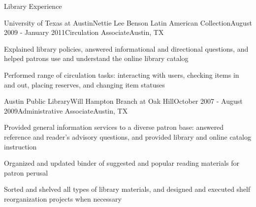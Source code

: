 \documentclass{resume} %
\begin{document}
\begin{rSection}{Library Experience}

\pagebreak

\begin{rSubsection}{University of Texas at Austin}{Nettie Lee Benson Latin American Collection}{August 2009 - January 2011}{Circulation Associate}{Austin, TX}
\item Explained library policies, answered informational and directional questions, and helped patrons use and understand the online library catalog
\item Performed range of circulation tasks: interacting with users, checking items in and out, placing reserves, and changing item statuses
\end{rSubsection}


\begin{rSubsection}{Austin Public Library}{Will Hampton Branch at Oak Hill}{October 2007 - August 2009}{Administrative Associate}{Austin, TX}
\item Provided general information services to a diverse patron base: answered reference and reader’s advisory questions, and provided library and online catalog instruction
\item Organized and updated binder of suggested and popular reading materials for patron perusal
\item Sorted and shelved all types of library materials, and designed and executed shelf reorganization projects when necessary
\end{rSubsection}



\end{rSection}

\pagebreak
\end{document}
